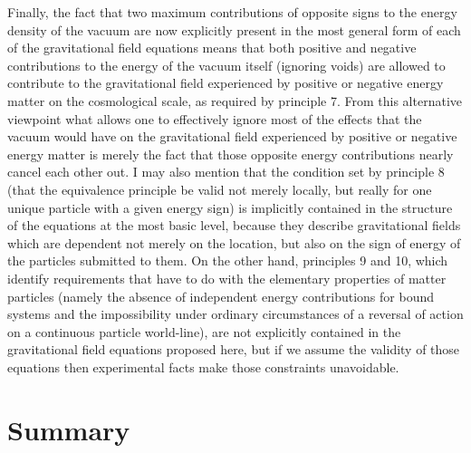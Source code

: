 \documentclass[notitlepage,12pt]{report}
\begin{document}
Finally, the fact that two maximum contributions of opposite signs to the energy density of the vacuum are now explicitly present in the most general form of each of the gravitational field equations means that both positive and negative contributions to the energy of the vacuum itself (ignoring voids) are allowed to contribute to the gravitational field experienced by positive or negative energy matter on the cosmological scale, as required by principle 7. From this alternative viewpoint what allows one to effectively ignore most of the effects that the vacuum would have on the gravitational field experienced by positive or negative energy matter is merely the fact that those opposite energy contributions nearly cancel each other out. I may also mention that the condition set by principle 8 (that the equivalence principle be valid not merely locally, but really for one unique particle with a given energy sign) is implicitly contained in the structure of the equations at the most basic level, because they describe gravitational fields which are dependent not merely on the location, but also on the sign of energy of the particles submitted to them. On the other hand, principles 9 and 10, which identify requirements that have to do with the elementary properties of matter particles (namely the absence of independent energy contributions for bound systems and the impossibility under ordinary circumstances of a reversal of action on a continuous particle world-line), are not explicitly contained in the gravitational field equations proposed here, but if we assume the validity of those equations then experimental facts make those constraints unavoidable.

\section{Summary}
\end{document}
